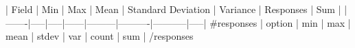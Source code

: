 | Field | Min | Max | Mean | Standard Deviation | Variance | Responses | Sum |
|-------|-----|-----|------|---------|----------|-----------|-----|
{{#responses}}
| {{{option}}} | {{min}} | {{max}} | {{mean}} | {{stdev}} | {{var}} | {{count}} | {{sum}} |
{{/responses}}